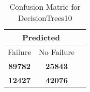 \begin{table}[] 
\caption{Confusion Matric for DecisionTrees10} 
\label{Table: Prediction Accuracy-DMDDecisionTrees10OnlySunEKF-combinationReflectionEKF-top2-Reflection} 
\centering 
\begin{tabular} 
 {@{}ccc@{}} 
\toprule 
\multicolumn{2}{c}{\textbf{Predicted}}
 \\ \midrule 
\multicolumn{1}{|c|}{Failure} & 
\multicolumn{1}{c|}{No Failure}
 \\ \midrule 
\multicolumn{1}{|c|}{\color{green}\textbf{89782}} & 
\multicolumn{1}{c|}{\color{red}\textbf{25843}}
 \\ \midrule 
\multicolumn{1}{|c|}{\color{red}\textbf{12427}} & 
\multicolumn{1}{c|}{\color{green}\textbf{42076}}
 \\ \bottomrule 
\end{tabular} 
\end{table} 
